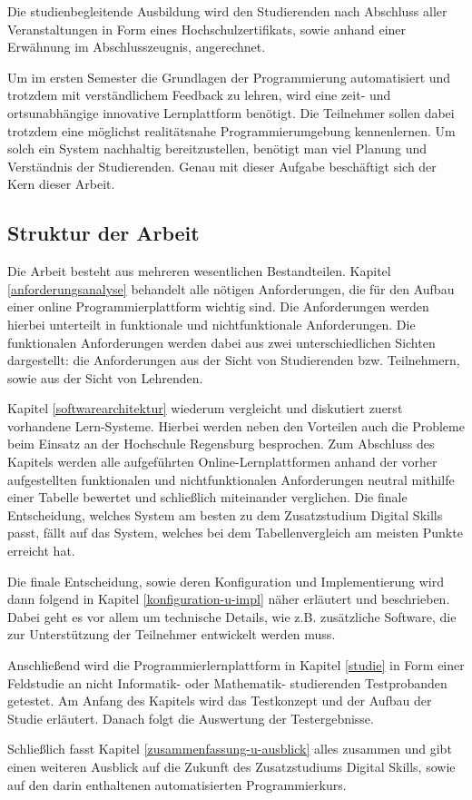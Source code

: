 Die studienbegleitende Ausbildung wird den Studierenden nach Abschluss aller
Veranstaltungen in Form eines Hochschulzertifikats, sowie anhand einer Erwähnung
im Abschlusszeugnis, angerechnet.

Um im ersten Semester die Grundlagen der Programmierung automatisiert und
trotzdem mit verständlichem Feedback zu lehren, wird eine zeit- und
ortsunabhängige innovative Lernplattform benötigt. Die Teilnehmer sollen dabei
trotzdem eine möglichst realitätsnahe Programmierumgebung kennenlernen. Um solch
ein System nachhaltig bereitzustellen, benötigt man viel Planung und Verständnis
der Studierenden. Genau mit dieser Aufgabe beschäftigt sich der Kern dieser
Arbeit.

\subsection{Struktur der Arbeit}\label{struktur-der-arbeit}
Die Arbeit besteht aus mehreren wesentlichen Bestandteilen. Kapitel
\ref{anforderungsanalyse} behandelt alle nötigen Anforderungen, die für den
Aufbau einer online Programmierplattform wichtig sind. Die Anforderungen werden
hierbei unterteilt in funktionale und nichtfunktionale Anforderungen. Die
funktionalen Anforderungen werden dabei aus zwei unterschiedlichen Sichten
dargestellt: die Anforderungen aus der Sicht von Studierenden bzw. Teilnehmern,
sowie aus der Sicht von Lehrenden.

Kapitel \ref{softwarearchitektur} wiederum vergleicht und diskutiert zuerst
vorhandene Lern-Systeme. Hierbei werden neben den Vorteilen auch die Probleme
beim Einsatz an der Hochschule Regensburg besprochen. Zum Abschluss des Kapitels
werden alle aufgeführten Online-Lernplattformen anhand der vorher aufgestellten
funktionalen und nichtfunktionalen Anforderungen neutral mithilfe einer Tabelle
bewertet und schließlich miteinander verglichen. Die finale Entscheidung,
welches System am besten zu dem Zusatzstudium Digital Skills passt, fällt auf
das System, welches bei dem Tabellenvergleich am meisten Punkte erreicht hat.

Die finale Entscheidung, sowie deren Konfiguration und Implementierung wird
dann folgend in Kapitel \ref{konfiguration-u-impl} näher erläutert und
beschrieben. Dabei geht es vor allem um technische Details, wie z.B. zusätzliche
Software, die zur Unterstützung der Teilnehmer entwickelt werden muss.

Anschließend wird die Programmierlernplattform in Kapitel \ref{studie} in Form
einer Feldstudie an nicht Informatik- oder Mathematik- studierenden
Testprobanden getestet. Am Anfang des Kapitels wird das Testkonzept und der
Aufbau der Studie erläutert. Danach folgt die Auswertung der Testergebnisse.

Schließlich fasst Kapitel \ref{zusammenfassung-u-ausblick} alles zusammen und
gibt einen weiteren Ausblick auf die Zukunft des Zusatzstudiums Digital Skills,
sowie auf den darin enthaltenen automatisierten Programmierkurs.